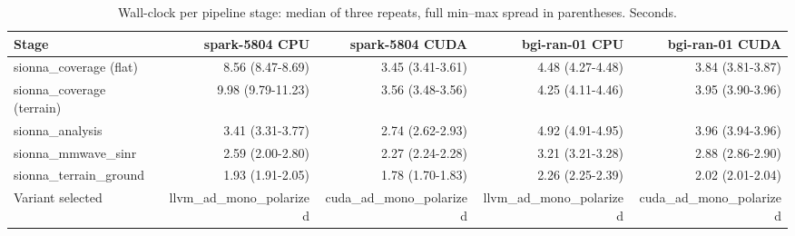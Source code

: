 \begin{table}[t]
  \centering
  \caption{Wall-clock per pipeline stage: median of three repeats, full min--max spread in parentheses. Seconds.}
  \label{tab:wall}
  \begin{tabular}{lrrrr}
    \toprule
    Stage & spark-5804 CPU & spark-5804 CUDA & bgi-ran-01 CPU & bgi-ran-01 CUDA \\
    \midrule
    sionna\_coverage (flat) & 8.56 (8.47-8.69) & 3.45 (3.41-3.61) & 4.48 (4.27-4.48) & 3.84 (3.81-3.87) \\
    sionna\_coverage (terrain) & 9.98 (9.79-11.23) & 3.56 (3.48-3.56) & 4.25 (4.11-4.46) & 3.95 (3.90-3.96) \\
    sionna\_analysis & 3.41 (3.31-3.77) & 2.74 (2.62-2.93) & 4.92 (4.91-4.95) & 3.96 (3.94-3.96) \\
    sionna\_mmwave\_sinr & 2.59 (2.00-2.80) & 2.27 (2.24-2.28) & 3.21 (3.21-3.28) & 2.88 (2.86-2.90) \\
    sionna\_terrain\_ground & 1.93 (1.91-2.05) & 1.78 (1.70-1.83) & 2.26 (2.25-2.39) & 2.02 (2.01-2.04) \\
    Variant selected & llvm\_ad\_mono\_polarized & cuda\_ad\_mono\_polarized & llvm\_ad\_mono\_polarized & cuda\_ad\_mono\_polarized \\
    \bottomrule
  \end{tabular}
\end{table}
